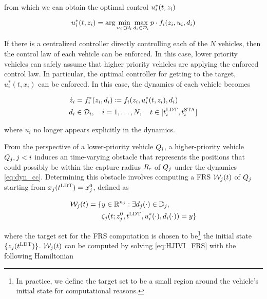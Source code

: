 \noindent from which we can obtain the optimal control $u_i^*(t, z_i)$

\begin{equation}
\label{eq:opt_ctrl_i}
\ctrl_i^*(t, \state_i) =  \arg \min_{\ctrl_i \in \cset_i} \max_{\dstb_i \in \dset_i} p \cdot \fdyn_i(\state_i, \ctrl_i, \dstb_i)
\end{equation}

If there is a centralized controller directly controlling each of the $N$ vehicles, then the control law of each vehicle can be enforced. In this case, lower priority vehicles can safely assume that higher priority vehicles are applying the enforced control law. In particular, the optimal controller for getting to the target, $u^*_i(t, x_i)$ can be enforced. In this case, the dynamics of each vehicle becomes 

\begin{equation}
\label{eq:dyn_cc}
\begin{aligned}
\dot \state_i &= \fdyn^*_i (\state_i, \dstb_i) \coloneqq \fdyn_i(\state_i, \ctrl^*_i(t, \state_i), \dstb_i) \\
\dstb_i &\in \dset_i, \quad i = 1,\ldots, N, \quad t \in [\ldt_i, \sta_i]
\end{aligned}
\end{equation}

\noindent where $u_i$ no longer appears explicitly in the dynamics.

From the perspective of a lower-priority vehicle $Q_{i}$, a higher-priority vehicle $Q_{j}, j < i$ induces an time-varying obstacle that represents the positions that could possibly be within the capture radius $R_c$ of $Q_{j}$ under the dynamics \eqref{eq:dyn_cc}. Determining this obstacle involves computing a FRS $\mathcal{W}_j(t)$ of $Q_{j}$ starting from $x_j(t^\text{LDT}) = x_j^0$, defined as 

\begin{equation}
\label{eq:FRS_cc}
\begin{aligned}
\frs_j(t) = \{&y \in \R^{n_j}: \exists d_j(\cdot) \in \dfset_j, \\
&\traj_j(t; \state^0_j, \ldt, \ctrl^*_i(\cdot), \dstb_i(\cdot) )= y\}
\end{aligned}
\end{equation}

\noindent where the target set for the FRS computation is chosen to be\footnote{In practice, we define the target set to be a small region around the vehicle's initial state for computational reasons.} the initial state $\{z_j(t^\text{LDT})\}$. $\mathcal{W}_j(t)$ can be computed by solving \eqref{eq:HJIVI_FRS} with the following Hamiltonian

